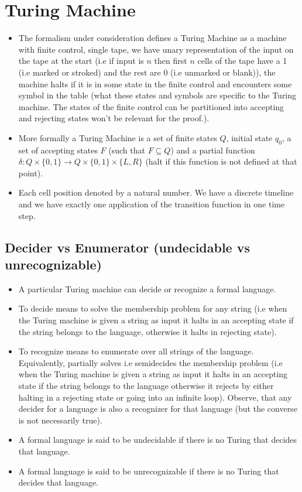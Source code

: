 \documentclass[
11pt,notheorems,hyperref={pdfauthor=whatever}
]{beamer}
\begin{document}
\section{Turing Machine}
\begin{frame}
\begin{itemize}
    \item The formalism under consideration defines a Turing Machine as a machine with finite control, single tape, we have unary representation of the input on the tape at the start (i.e if input is $n$ then first $n$ cells of the tape have a 1 (i.e marked or stroked) and the rest are 0 (i.e unmarked or blank)), the machine halts if it is in some state in the finite control and encounters some symbol in the table (what these states and symbols are specific to the Turing machine. The states of the finite control can be partitioned into accepting and rejecting states won't be relevant for the proof.).
    \item More formally a Turing Machine is a set of finite states $Q$, initial state $q_0$, a set of accepting states $F$ (such that $F \subseteq Q$) and a partial function $\delta : Q \times \{0, 1\} \to Q \times \{0, 1\} \times \{L, R\}$ (halt if this function is not defined at that point).
    \item Each cell position denoted by a natural number. We have a discrete timeline and we have exactly one application of the transition function in one time step.
\end{itemize}
\end{frame}

\subsection{Decider vs Enumerator (undecidable vs unrecognizable)}
\begin{frame}
\begin{itemize}
    \item A particular Turing machine can decide or recognize a formal language.
    \item To decide means to solve the membership problem for any string (i.e when the Turing machine is given a string as input it halts in an accepting state if the string belongs to the language, otherwise it halts in rejecting state).
    \item To recognize means to enumerate over all strings of the language. Equivalently, partially solves i.e semidecides the membership problem (i.e when the Turing machine is given a string as input it halts in an accepting state if the string belongs to the language otherwise it rejects by either halting in a rejecting state or going into an infinite loop). Observe, that any decider for a language is also a recognizer for that language (but the converse is not necessarily true).
    \item A formal language is said to be undecidable if there is no Turing that decides that language.
    \item A formal language is said to be unrecognizable if there is no Turing that decides that language.
\end{itemize}
\end{frame}
\end{document}

